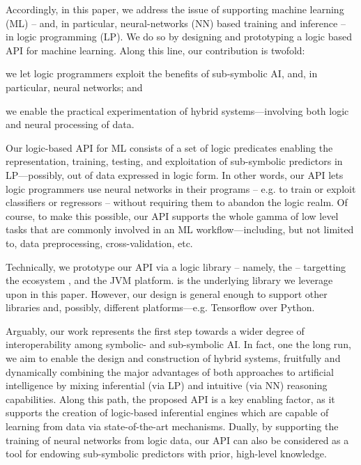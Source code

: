 \documentclass{article}
\begin{document}
Accordingly, in this paper, we address the issue of supporting machine learning (ML) -- and, in particular, neural-networks (NN) based training and inference -- in logic programming (LP).
%
We do so by designing and prototyping a logic based API for machine learning.
%
Along this line, our contribution is twofold:
%
\begin{inlinelist}
    \item we let logic programmers exploit the benefits of sub-symbolic AI, and, in particular, neural networks; and
    \item we enable the practical experimentation of hybrid systems---involving both logic and neural processing of data.
\end{inlinelist}

Our logic-based API for ML consists of a set of logic predicates enabling the representation, training, testing, and exploitation of sub-symbolic predictors in LP---possibly, out of data expressed in logic form.
%
In other words, our API lets logic programmers use neural networks in their programs -- e.g. to train or exploit classifiers or regressors -- without requiring them to abandon the logic realm.
%
Of course, to make this possible, our API supports the whole gamma of low level tasks that are commonly involved in an ML workflow---including, but not limited to, data preprocessing, cross-validation, etc.

Technically, we prototype our API via a logic library -- namely, the \mllib{} -- targetting the \twopkt{} ecosystem \cite{2p-kt}, and the JVM platform.
%
\deeplearningforj{} \cite{DL4J} is the underlying library we leverage upon in this paper.
%
However, our design is general enough to support other libraries and, possibly, different platforms---e.g. Tensorflow \cite{tensorflow2015-whitepaper} over Python.

Arguably, our work represents the first step towards a wider degree of interoperability among symbolic- and sub-symbolic AI.
%
In fact, one the long run, we aim to enable the design and construction of hybrid systems, fruitfully and dynamically combining the major advantages of both approaches to artificial intelligence by mixing inferential (via LP) and intuitive (via NN) reasoning capabilities.
%
Along this path, the proposed API is a key enabling factor, as it supports the creation of logic-based inferential engines which are capable of learning from data via state-of-the-art mechanisms.
%
Dually, by supporting the training of neural networks from logic data, our API can also be considered as a tool for endowing sub-symbolic predictors with prior, high-level knowledge.
\end{document}
